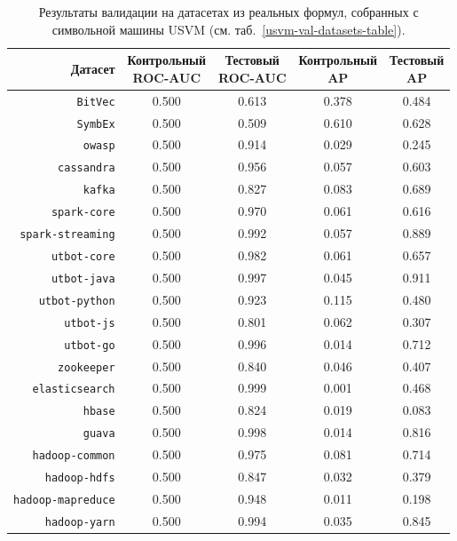 \begin{table}[ht]
\begin{center}
\begin{tabular}{r|cc|cc}
    Датасет & \makecell{Контрольный \\ \textsc{ROC-AUC}} & \makecell{Тестовый \\ \textsc{ROC-AUC}} & \makecell{Контрольный \\ \textsc{AP}} & \makecell{Тестовый \\ \textsc{AP}} \\
    \hline \hline
    \rule{0pt}{2.5ex}
    \texttt{BitVec}           & 0.500 & 0.613 & 0.378 & 0.484 \\
    \texttt{SymbEx}           & 0.500 & 0.509 & 0.610 & 0.628 \\
    \hline
    \texttt{owasp}            & 0.500 & 0.914 & 0.029 & 0.245 \\
    \texttt{cassandra}        & 0.500 & 0.956 & 0.057 & 0.603 \\
    \texttt{kafka}            & 0.500 & 0.827 & 0.083 & 0.689 \\
    \texttt{spark-core}       & 0.500 & 0.970 & 0.061 & 0.616 \\
    \texttt{spark-streaming}  & 0.500 & 0.992 & 0.057 & 0.889 \\
    \texttt{utbot-core}       & 0.500 & 0.982 & 0.061 & 0.657 \\
    \texttt{utbot-java}       & 0.500 & 0.997 & 0.045 & 0.911 \\
    \texttt{utbot-python}     & 0.500 & 0.923 & 0.115 & 0.480 \\
    \texttt{utbot-js}         & 0.500 & 0.801 & 0.062 & 0.307 \\
    \texttt{utbot-go}         & 0.500 & 0.996 & 0.014 & 0.712 \\
    \texttt{zookeeper}        & 0.500 & 0.840 & 0.046 & 0.407 \\
    \texttt{elasticsearch}    & 0.500 & 0.999 & 0.001 & 0.468 \\
    \texttt{hbase}            & 0.500 & 0.824 & 0.019 & 0.083 \\
    \texttt{guava}            & 0.500 & 0.998 & 0.014 & 0.816 \\
    \texttt{hadoop-common}    & 0.500 & 0.975 & 0.081 & 0.714 \\
    \texttt{hadoop-hdfs}      & 0.500 & 0.847 & 0.032 & 0.379 \\
    \texttt{hadoop-mapreduce} & 0.500 & 0.948 & 0.011 & 0.198 \\
    \texttt{hadoop-yarn}      & 0.500 & 0.994 & 0.035 & 0.845 \\
\end{tabular}
\caption{\label{usvm-val-results-roc-auc-avg-prec} Результаты валидации на датасетах из реальных формул, собранных с символьной машины USVM \cite{usvm-diploma} (см. таб.~\ref{usvm-val-datasets-table}).}
\end{center}
\end{table}

